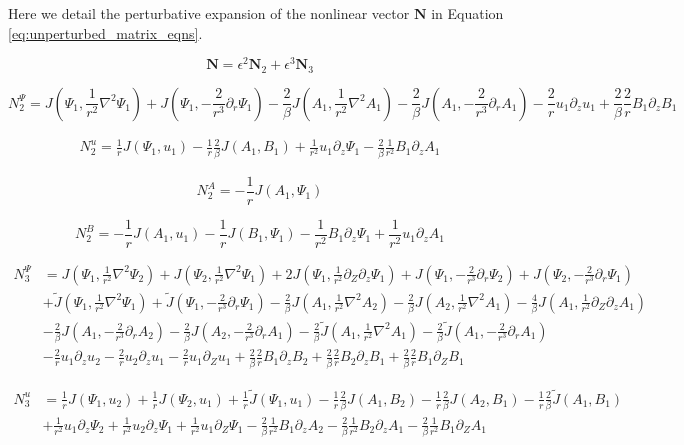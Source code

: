 \documentclass{emulateapj}
\newcommand{\beq}{\begin{equation}}
\newcommand{\eeq}{\end{equation}}
\begin{document}
Here we detail the perturbative expansion of the nonlinear vector $\mathbf{N}$ in Equation \ref{eq:unperturbed_matrix_eqns}. 

\beq
\mathbf{N} = \epsilon^2 \mathbf{N}_2 + \epsilon^3 \mathbf{N}_3
\eeq

\beq
N_2^{\Psi}  = J(\Psi_1, \frac{1}{r^2} \nabla^2 \Psi_1) + J(\Psi_1, -\frac{2}{r^3}\partial_r\Psi_1)
- \frac{2}{\beta} J (A_1, \frac{1}{r^2} \nabla^2 A_1) - \frac{2}{\beta} J(A_1, -\frac{2}{r^3} \partial_r A_1) - \frac{2}{r} u_1 \partial_z u_1 + \frac{2}{\beta} \frac{2}{r} B_1 \partial_z B_1
\eeq

\beq
\begin{split}
N_2^{u} = \frac{1}{r} J\left(\Psi_1, u_1\right) - \frac{1}{r} \frac{2}{\beta} J\left(A_1, B_1\right) + \frac{1}{r^2} u_1 \partial_z \Psi_1 - \frac{2}{\beta}\frac{1}{r^2} B_1 \partial_z A_1
\end{split}
\eeq

\beq
N_2^A = -\frac{1}{r} J\left(A_1, \Psi_1\right)
\eeq

\beq
N_2^B = -\frac{1}{r} J\left(A_1, u_1\right) - \frac{1}{r} J\left(B_1, \Psi_1\right) - \frac{1}{r^2} B_1 \partial_z \Psi_1 + \frac{1}{r^2} u_1 \partial_z A_1
\eeq

\beq
\begin{split}
N_3^{\Psi} & = J(\Psi_1, \frac{1}{r^2} \nabla^2 \Psi_2) + J(\Psi_2, \frac{1}{r^2} \nabla^2\Psi_1) + 2 J (\Psi_1, \frac{1}{r^2}\partial_Z\partial_z \Psi_1) + J(\Psi_1, -\frac{2}{r^3}\partial_r \Psi_2) + J(\Psi_2, -\frac{2}{r^3}\partial_r \Psi_1) \\
& + \widetilde{J}(\Psi_1, \frac{1}{r^2} \nabla^2 \Psi_1) + \widetilde{J} (\Psi_1, -\frac{2}{r^3}\partial_r \Psi_1) - \frac{2}{\beta} J(A_1, \frac{1}{r^2}\nabla^2 A_2) - \frac{2}{\beta} J(A_2, \frac{1}{r^2}\nabla^2 A_1) - \frac{4}{\beta} J(A_1, \frac{1}{r^2}\partial_Z\partial_z A_1) \\ & - \frac{2}{\beta} J(A_1, -\frac{2}{r^3} \partial_r A_2 ) 
 - \frac{2}{\beta} J(A_2, -\frac{2}{r^3} \partial_r A_1) - \frac{2}{\beta} \widetilde{J} (A_1, \frac{1}{r^2} \nabla^2 A_1) - \frac{2}{\beta} \widetilde{J} (A_1, -\frac{2}{r^3} \partial_r A_1) \\
& - \frac{2}{r} u_1 \partial_z u_2 - \frac{2}{r} u_2 \partial_z u_1 - \frac{2}{r} u_1 \partial_Z u_1 + \frac{2}{\beta}\frac{2}{r} B_1\partial_z B_2 + \frac{2}{\beta}\frac{2}{r} B_2 \partial_z B_1 + \frac{2}{\beta} \frac{2}{r} B_1 \partial_Z B_1
\end{split}
\eeq

\beq
\begin{split}
N_3^u & = \frac{1}{r}J\left(\Psi_1, u_2\right) + \frac{1}{r}J\left(\Psi_2, u_1\right) + \frac{1}{r}\widetilde{J} \left(\Psi_1, u_1\right) - \frac{1}{r}\frac{2}{\beta} J\left(A_1, B_2\right) - \frac{1}{r} \frac{2}{\beta} J\left(A_2, B_1\right) - \frac{1}{r}\frac{2}{\beta}\widetilde{J}\left(A_1, B_1\right) \\
& + \frac{1}{r^2} u_1\partial_z \Psi_2 + \frac{1}{r^2} u_2 \partial_z \Psi_1 + \frac{1}{r^2} u_1 \partial_Z \Psi_1 - \frac{2}{\beta} \frac{1}{r^2} B_1 \partial_z A_2 - \frac{2}{\beta} \frac{1}{r^2} B_2 \partial_z A_1 - \frac{2}{\beta} \frac{1}{r^2} B_1 \partial_Z A_1
\end{split}
\eeq
\end{document}
